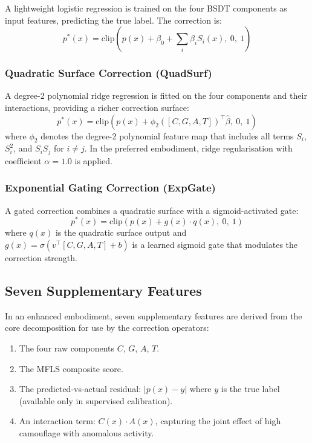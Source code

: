 \documentclass[12pt,a4paper]{article}
\begin{document}
A lightweight logistic regression is trained on the four BSDT components as 
input features, predicting the true label. The correction is:
\begin{equation}
p^*(x) = \text{clip}\left(p(x) + \beta_0 + \sum_{i} \beta_i S_i(x), 
\ 0, \ 1\right)
\end{equation}

\subsubsection{Quadratic Surface Correction (QuadSurf)}

A degree-2 polynomial ridge regression is fitted on the four components and 
their interactions, providing a richer correction surface:
\begin{equation}
p^*(x) = \text{clip}\left(p(x) + \phi_2([C, G, A, T])^\top 
\hat{\beta}, \ 0, \ 1\right)
\end{equation}
where $\phi_2$ denotes the degree-2 polynomial feature map that includes 
all terms $S_i$, $S_i^2$, and $S_i S_j$ for $i \neq j$. In the preferred 
embodiment, ridge regularisation with coefficient $\alpha = 1.0$ is applied.

\subsubsection{Exponential Gating Correction (ExpGate)}

A gated correction combines a quadratic surface with a sigmoid-activated 
gate:
\begin{equation}
p^*(x) = \text{clip}\left(p(x) + g(x) \cdot q(x), \ 0, \ 1\right)
\end{equation}
where $q(x)$ is the quadratic surface output and $g(x) = \sigma(v^\top 
[C, G, A, T] + b)$ is a learned sigmoid gate that modulates the correction 
strength.

\subsection{Seven Supplementary Features}

In an enhanced embodiment, seven supplementary features are derived from the 
core decomposition for use by the correction operators:
\begin{enumerate}
\item[$\varphi_1$--$\varphi_4$:] The four raw components $C$, $G$, $A$, $T$.
\item[$\varphi_5$:] The MFLS composite score.
\item[$\varphi_6$:] The predicted-vs-actual residual: $|p(x) - y|$ where 
$y$ is the true label (available only in supervised calibration).
\item[$\varphi_7$:] An interaction term: $C(x) \cdot A(x)$, capturing the 
joint effect of high camouflage with anomalous activity.
\end{enumerate}
\end{document}
